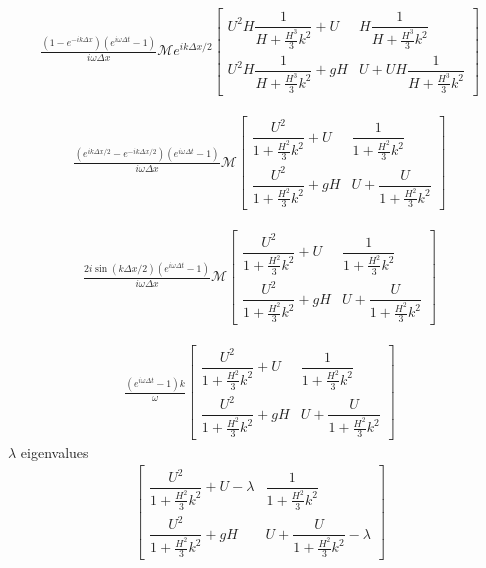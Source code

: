 \documentclass[12pt]{article}
\begin{document}
\begin{align}
\frac{\left(1 - e^{-ik\Delta x}\right) \left(e^{i\omega \Delta t} -1\right) }{ i\omega\Delta x} \mathcal{M} e^{i {k\Delta x}/{2}} \begin{bmatrix}
U^2H\dfrac{1}{H  + \frac{H^3}{3}k^2} + U &  H\dfrac{1}{H  + \frac{H^3}{3}k^2}\\
U^2H\dfrac{ 1}{H  + \frac{H^3}{3}k^2} + gH  &U + UH\dfrac{ 1}{H  + \frac{H^3}{3}k^2} 
\end{bmatrix}
\end{align}

\begin{align}
\frac{\left(e^{i {k\Delta x}/{2}} - e^{-i {k\Delta x}/{2}}\right) \left(e^{i\omega \Delta t} -1\right) }{ i\omega\Delta x} \mathcal{M}  \begin{bmatrix}
\dfrac{U^2}{1  + \frac{H^2}{3}k^2} + U &  \dfrac{1}{1  + \frac{H^2}{3}k^2}\\\dfrac{ U^2}{1  + \frac{H^2}{3}k^2} + gH &
U + \dfrac{ U}{1  + \frac{H^2}{3}k^2}
\end{bmatrix}
\end{align}

\begin{align}
\frac{2i\sin\left(k \Delta x/2\right) \left(e^{i\omega \Delta t} -1\right) }{ i\omega\Delta x} \mathcal{M}  \begin{bmatrix}
\dfrac{U^2}{1  + \frac{H^2}{3}k^2} + U &  \dfrac{1}{1  + \frac{H^2}{3}k^2}\\
\dfrac{ U^2}{1  + \frac{H^2}{3}k^2} + gH & U + \dfrac{ U}{1  + \frac{H^2}{3}k^2} 
\end{bmatrix}
\end{align}

\begin{align}
\frac{\left(e^{i\omega \Delta t} -1\right)  k}{\omega}  \begin{bmatrix}
\dfrac{U^2}{1  + \frac{H^2}{3}k^2} + U &  \dfrac{1}{1  + \frac{H^2}{3}k^2}\\
\dfrac{ U^2}{1  + \frac{H^2}{3}k^2} + gH  & U + \dfrac{ U}{1  + \frac{H^2}{3}k^2}
\end{bmatrix}
\end{align}
$\lambda$ eigenvalues
\begin{align}
\begin{bmatrix}
\dfrac{U^2}{1  + \frac{H^2}{3}k^2} + U  - \lambda&  \dfrac{1}{1  + \frac{H^2}{3}k^2}\\
\dfrac{ U^2}{1  + \frac{H^2}{3}k^2} + gH & U + \dfrac{ U}{1  + \frac{H^2}{3}k^2}  - \lambda 
\end{bmatrix}
\end{align}
\end{document}
